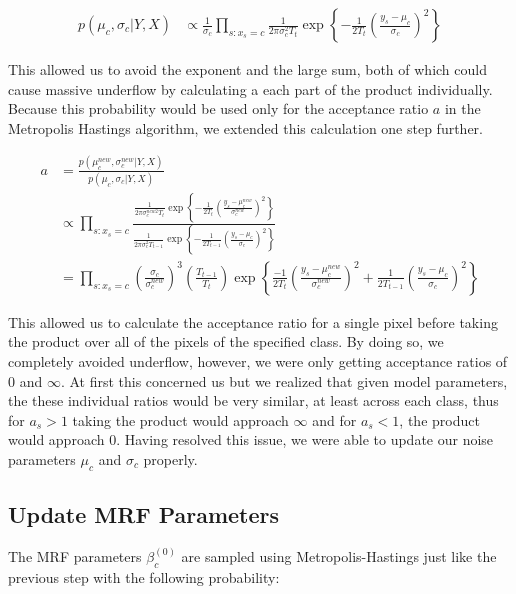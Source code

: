 \documentclass[11pt]{article}
\begin{document}
\begin{equation}
\begin{aligned}
p\left(\mu_{c}, \sigma_{c} | Y, X\right) & \propto \frac{1}{\sigma_{c}}\prod_{s: x_{s}=c} \frac{1}{2 \pi \sigma_{c}^{2} T_{t}} \exp \left\{-\frac{1}{2 T_{t}} \left(\frac{y_{s}-\mu_{c}}{\sigma_{c}}\right)^{2} \right\}
\end{aligned}
\end{equation}

This allowed us to avoid the exponent and the large sum, both of which could cause massive underflow by calculating a each part of the product individually.
Because this probability would be used only for the acceptance ratio $a$ in the Metropolis Hastings algorithm, we extended this calculation one step further.

\begin{equation}
\begin{aligned}
a & = \frac{p\left(\mu_{c}^{new}, \sigma_{c}^{new} | Y, X\right)}{p\left(\mu_{c}, \sigma_{c} | Y, X\right)}\\ & \propto \prod_{s: x_{s}=c}  \frac{\frac{1}{2 \pi \sigma_{c}^{new2} T_{t}} \exp \left\{-\frac{1}{2 T_{t}} \left(\frac{y_{s}-\mu_{c}^{new}}{\sigma_{c}^{new}}\right)^{2} \right\}}{\frac{1}{2 \pi \sigma_{c}^{2} T_{t-1}} \exp \left\{-\frac{1}{2 T_{t-1}} \left(\frac{y_{s}-\mu_{c}}{\sigma_{c}}\right)^{2} \right\}}\\
&= \prod_{s: x_s = c} \left( \frac{\sigma_c}{\sigma_c^{new}} \right)^{3} \left( \frac{T_{t-1}}{T_t} \right) \exp \left\{ \frac{-1}{2 T_t} \left( \frac{y_s - \mu_c^{new}}{\sigma_c^{new}} \right)^2 + \frac{1}{2 T_{t-1}} \left( \frac{y_s - \mu_c}{\sigma_c} \right)^2  \right\}
\end{aligned}
\end{equation}

This allowed us to calculate the acceptance ratio for a single pixel before taking the product over all of the pixels of the specified class.
By doing so, we completely avoided underflow, however, we were only getting acceptance ratios of $0$ and $\infty$.
At first this concerned us but we realized that given model parameters, the these individual ratios would be very similar, at least across each class, thus for $a_{s} > 1$ taking the product would approach $\infty$ and for $a_{s} < 1$, the product would approach 0.
Having resolved this issue, we were able to update our noise parameters $\mu_{c}$ and $\sigma_{c}$ properly.

\subsection{Update MRF Parameters}
The MRF parameters $\beta_{c}^{(0)}$ are sampled using Metropolis-Hastings just like the previous step with the following probability:
\end{document}
